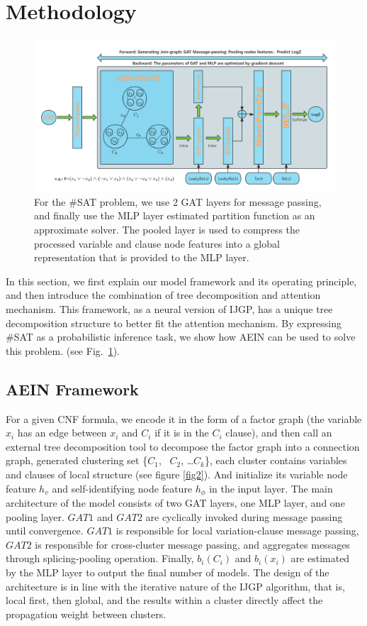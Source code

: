 \section{Methodology}

\begin{figure}[h]
\centering 
\includegraphics[width=1\textwidth]{png/AEIN2.png}
\caption{For the \#SAT problem, we use 2 GAT layers for message passing, and finally use the MLP layer estimated 
partition function as an approximate solver. The pooled layer is used to compress the processed variable and clause 
node features into a global representation that is provided to the MLP layer.} \label{fig1}
\end{figure}

In this section, we first explain our model framework and its operating principle, and then introduce the combination 
of tree decomposition and attention mechanism. This framework, as a neural version of IJGP, has a unique tree 
decomposition structure to better fit the attention mechanism. By expressing \#SAT as a probabilistic inference task, 
we show how AEIN can be used to solve this problem. (see Fig.~\ref{fig1}).

\subsection{AEIN Framework}
For a given CNF formula, we encode it in the form of a factor graph (the variable \(x_i\) has an edge between \(x_i\) 
and \(C_i\) if it is in the \(C_i\) clause), and then call an external tree decomposition tool to decompose the factor 
graph into a connection graph, generated clustering set \{\(C_1\), \ \(C_2\), \ldots \(C_k\)\}, each cluster contains 
variables and clauses of local structure (see figure \ref{fig2}). And initialize its variable node feature \(h_v\) and 
self-identifying node feature \(h_\phi\) in the input layer. The main architecture of the model consists of two GAT 
layers, one MLP layer, and one pooling layer. \(GAT1\) and \(GAT2\) are cyclically invoked during message passing until 
convergence. \(GAT1\) is responsible for local variation-clause message passing, \(GAT2\) is responsible for cross-cluster 
message passing, and aggregates messages through splicing-pooling operation. Finally, \(b_i(C_i)\) and \(b_i(x_i)\) are 
estimated by the MLP layer to output the final number of models. The design of the architecture is in line with the iterative 
nature of the IJGP algorithm, that is, local first, then global, and the results within a cluster directly affect the 
propagation weight between clusters.


